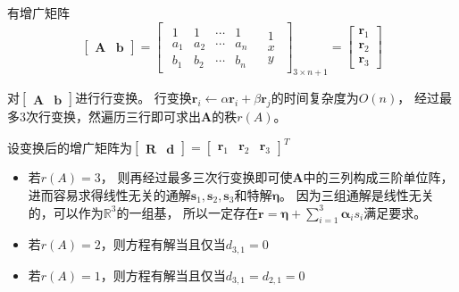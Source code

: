 \documentclass[answers]{exam}
\begin{document}
\begin{questions}
\begin{solution}
        有增广矩阵
        \[
            \begin{bmatrix}
                \bm A & \bm b
            \end{bmatrix}
            = \left[
                \begin{array}{c|c}
                    \begin{matrix}
                        1   & 1   & \cdots & 1   \\
                        a_1 & a_2 & \cdots & a_n \\
                        b_1 & b_2 & \cdots & b_n
                    \end{matrix} &
                    \begin{matrix}
                        1 \\
                        x \\
                        y
                    \end{matrix}
                \end{array}
                \right]_{3\times n+1}
            =\begin{bmatrix}
                \bm r_1 \\ \bm r_2 \\ \bm r_3
            \end{bmatrix}
        \]

        对$\begin{bmatrix} \bm A & \bm b \end{bmatrix}$进行行变换。
        行变换$\bm r_i \gets \alpha \bm r_i + \beta \bm r_j$的时间复杂度为$O(n)$，
        经过最多3次行变换，然遍历三行即可求出$\bm A$的秩$r(A)$。


        设变换后的增广矩阵为$
            \begin{bmatrix} \bm R & \bm d \end{bmatrix}
            =\begin{bmatrix}
                \bm r_1 & \bm r_2 & \bm r_3
            \end{bmatrix}^T
        $
        \begin{itemize}
            \item 若$r(A) = 3$，
                  则再经过最多三次行变换即可使$\bm A$中的三列构成三阶单位阵，
                  进而容易求得线性无关的通解$\bm s_1,\bm s_2,\bm s_3$和特解$\bm \eta$。
                  因为三组通解是线性无关的，可以作为$\mathbb{R}^3$的一组基，
                  所以一定存在$\bm r = \bm \eta + \sum_{i=1}^3 \bm \alpha_i s_i$满足要求。
            \item 若$r(A) = 2$，则方程有解当且仅当$d_{3,1} = 0$
            \item 若$r(A) = 1$，则方程有解当且仅当$d_{3,1} = d_{2,1} = 0$
        \end{itemize}


\end{solution}
\end{questions}
\end{document}
